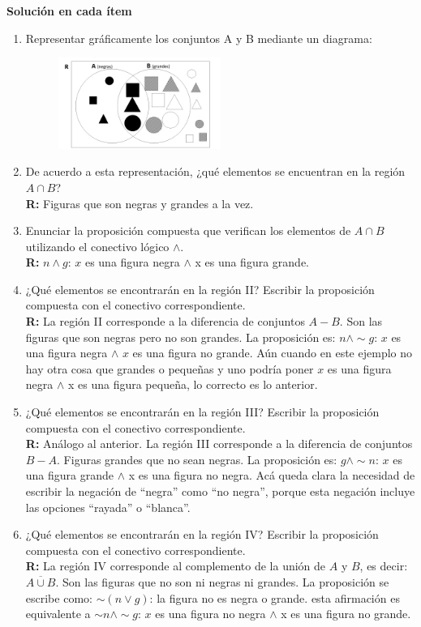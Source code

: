 \documentclass[12pt]{article}
\theoremstyle{definition}
\theoremstyle{remark}
\begin{document}
\begin{enumerate}
\noindent
\textbf{Solución en cada ítem} 
\begin{enumerate}
\item Representar gráficamente los conjuntos A y B mediante un diagrama: 
\begin{figure}[H]
\centering
\includegraphics[width=0.5\textwidth]{7a}
\end{figure}
\item De acuerdo a esta representación, ¿qué elementos se encuentran en la región $A\cap B$?\\
\textbf{R:} Figuras que son negras y grandes a la vez.
\item Enunciar la proposición compuesta que verifican los elementos de $A\cap B$ utilizando el conectivo lógico $\wedge$.\\
\textbf{R:} $n \wedge g$: $x$ es una figura negra $\land$ x es una figura grande.
\item ¿Qué elementos se encontrarán en la región II? Escribir la proposición compuesta con el conectivo correspondiente.\\
\textbf{R:} La región II corresponde a la diferencia de conjuntos $A-B$. Son las figuras que son negras pero no son grandes. La proposición es: $n \wedge \sim g$: $x$ es una figura negra $\land$ $x$ es una figura no grande. Aún cuando en este ejemplo no hay otra cosa que grandes o pequeñas y uno podría poner $x$ es una figura negra $\land$ x es una figura pequeña, lo correcto es lo anterior.
\item ¿Qué elementos se encontrarán en la región III? Escribir la proposición compuesta con el conectivo correspondiente.\\
\textbf{R:} Análogo al anterior. La región III corresponde a la diferencia de conjuntos $B-A$. Figuras grandes que no sean negras. La proposición es: $g  \wedge \sim n$: $x$ es una figura grande $\land$ x es una figura no negra. Acá queda clara la necesidad de escribir la negación de “negra'' como “no negra'', porque esta negación incluye las opciones “rayada'' o “blanca''. 
\item ¿Qué elementos se encontrarán en la región IV? Escribir la proposición compuesta con el conectivo correspondiente.\\
\textbf{R:} La región IV corresponde al complemento de la unión de $A$ y $B$, es decir: $\overline{A\cup B}$. Son las figuras que no son ni negras ni grandes. La proposición se escribe como: $ \sim(n \vee  g)$: la figura no es negra o grande. esta afirmación es equivalente a $\sim n \wedge \sim g$: $x$ es una figura no negra $\land$ x es una figura no grande. 
\end{enumerate}




\end{enumerate}
\end{document}
